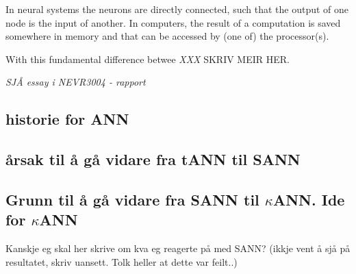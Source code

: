 In neural systems the neurons are directly connected, such that the output of one node is the input of another. In computers, the result of a computation is saved somewhere in memory and that can be accessed by (one of) the processor(s).

With this fundamental difference betwee  \emph{XXX} SKRIV MEIR HER.


\newpage
		\emph{SJÅ essay i NEVR3004 - rapport}

	\subsection{historie for ANN}


	\subsection{årsak til å gå vidare fra tANN til SANN}
	\subsection{Grunn til å gå vidare fra SANN til $\kappa$ANN. Ide for $\kappa$ANN}
		Kanskje eg skal her skrive om kva eg  reagerte på med SANN? (ikkje vent å sjå på resultatet, skriv uansett. Tolk heller at dette var feilt..)







